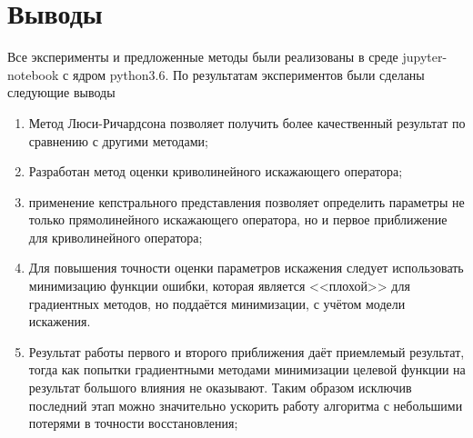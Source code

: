 \section{Выводы}
Все эксперименты и предложенные методы были реализованы в среде jupyter-notebook с ядром python3.6. По результатам экспериментов были сделаны следующие выводы
\begin{enumerate}
	\item Метод Люси-Ричардсона позволяет получить более качественный результат по сравнению с другими методами;
	\item Разработан метод оценки криволинейного искажающего оператора;
	\item применение кепстрального представления позволяет определить параметры не только прямолинейного искажающего оператора, но и первое приближение для криволинейного оператора;
	\item Для повышения точности оценки параметров искажения следует использовать минимизацию функции ошибки, которая является <<плохой>> для градиентных методов, но поддаётся минимизации, с учётом модели искажения.
	\item Результат работы первого и второго приближения даёт приемлемый результат, тогда как попытки градиентными методами минимизации целевой функции на результат большого влияния не оказывают. Таким образом исключив последний этап можно значительно ускорить работу алгоритма с небольшими потерями в точности восстановления;
\end{enumerate}